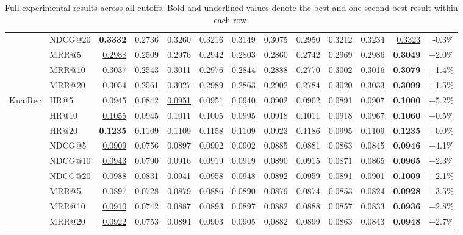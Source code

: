 \documentclass[sigconf,review,anonymous]{acmart}
\newcommand{\tblbest}[1]{\textbf{#1}}
\newcommand{\tblsecond}[1]{\underline{#1}}
\begin{document}
\begin{table}[t]
{\begin{tabular}{llrrrrrrrrrrr}
      & NDCG@20 & \tblbest{0.3332} & 0.2736 & 0.3260 & 0.3216 & 0.3149 & 0.3075 & 0.2950 & 0.3212 & 0.3234 & \tblsecond{0.3323} & -0.3\% \\
      & MRR@5   & \tblsecond{0.2988} & 0.2509 & 0.2976 & 0.2942 & 0.2803 & 0.2860 & 0.2742 & 0.2969 & 0.2986 & \tblbest{0.3049} & +2.0\% \\
      & MRR@10  & \tblsecond{0.3037} & 0.2543 & 0.3011 & 0.2976 & 0.2844 & 0.2888 & 0.2770 & 0.3002 & 0.3016 & \tblbest{0.3079} & +1.4\% \\
      & MRR@20  & \tblsecond{0.3054} & 0.2561 & 0.3027 & 0.2989 & 0.2863 & 0.2902 & 0.2784 & 0.3020 & 0.3033 & \tblbest{0.3099} & +1.5\% \\
    \midrule
    \multirow{9}{*}{KuaiRec}
      & HR@5    & 0.0945 & 0.0842 & \tblsecond{0.0951} & 0.0951 & 0.0940 & 0.0902 & 0.0902 & 0.0891 & 0.0907 & \tblbest{0.1000} & +5.2\% \\
      & HR@10   & \tblsecond{0.1055} & 0.0945 & 0.1011 & 0.1005 & 0.0995 & 0.0918 & 0.1011 & 0.0918 & 0.0967 & \tblbest{0.1060} & +0.5\% \\
      & HR@20   & \tblbest{0.1235} & 0.1109 & 0.1109 & 0.1158 & 0.1109 & 0.0923 & \tblsecond{0.1186} & 0.0995 & 0.1109 & \tblbest{0.1235} & +0.0\% \\
      & NDCG@5  & \tblsecond{0.0909} & 0.0756 & 0.0897 & 0.0902 & 0.0902 & 0.0885 & 0.0881 & 0.0863 & 0.0845 & \tblbest{0.0946} & +4.1\% \\
      & NDCG@10 & \tblsecond{0.0943} & 0.0790 & 0.0916 & 0.0919 & 0.0919 & 0.0890 & 0.0915 & 0.0871 & 0.0865 & \tblbest{0.0965} & +2.3\% \\
      & NDCG@20 & \tblsecond{0.0988} & 0.0831 & 0.0941 & 0.0958 & 0.0948 & 0.0892 & 0.0959 & 0.0891 & 0.0901 & \tblbest{0.1009} & +2.1\% \\
      & MRR@5   & \tblsecond{0.0897} & 0.0728 & 0.0879 & 0.0886 & 0.0890 & 0.0879 & 0.0874 & 0.0853 & 0.0824 & \tblbest{0.0928} & +3.5\% \\
      & MRR@10  & \tblsecond{0.0910} & 0.0742 & 0.0887 & 0.0893 & 0.0897 & 0.0882 & 0.0888 & 0.0857 & 0.0833 & \tblbest{0.0936} & +2.8\% \\
      & MRR@20  & \tblsecond{0.0922} & 0.0753 & 0.0894 & 0.0903 & 0.0905 & 0.0882 & 0.0899 & 0.0863 & 0.0843 & \tblbest{0.0948} & +2.7\% \\
    \bottomrule
  \end{tabular}}
  \caption{Full experimental results across all cutoffs. Bold and underlined values denote the best and one second-best result within each row.}
  \label{tab:appendix-full-seen}
\end{table}
\end{document}
